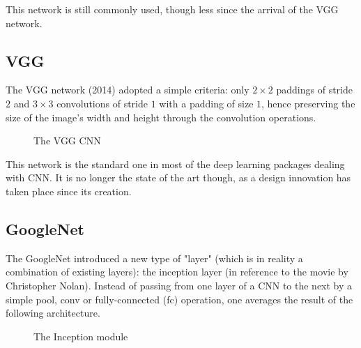 This network is still commonly used, though less since the arrival of the VGG network.

\subsection{VGG}

The VGG\cite{DBLP:journals/corr/SimonyanZ14a} network (2014) adopted a simple criteria: only $2 \times 2$ paddings of stride $2$ and $3\times 3$ convolutions of stride $1$ with a padding of size $1$, hence preserving the size of the image's width and height through the convolution operations.

\begin{figure}[H]
\begin{center}
\caption{The VGG CNN}
\end{center}
\end{figure}

This network is the standard one in most of the deep learning packages dealing with CNN. It is no longer the state of the art though, as a design innovation has taken place since its creation.

\subsection{GoogleNet}

The GoogleNet\cite{43022} introduced a new type of "layer" (which is in reality a combination of existing layers): the inception layer (in reference to the movie by Christopher Nolan). Instead of passing from one layer of a CNN to the next by a simple pool, conv or fully-connected (fc) operation, one averages the result of the following architecture.

\begin{figure}[H]
\begin{center}
\caption{The Inception module}
\end{center}
\end{figure}

